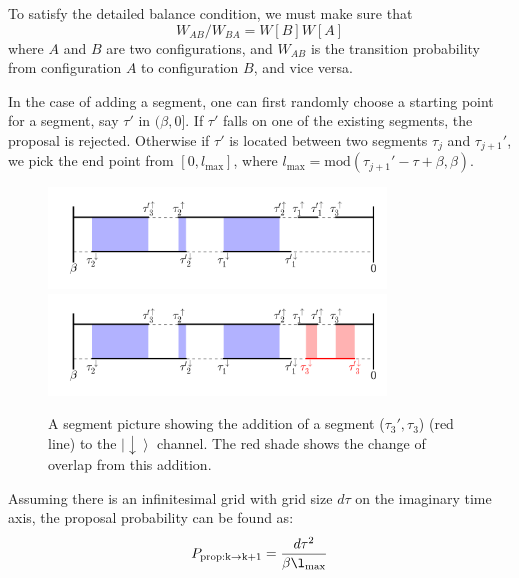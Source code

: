 To satisfy the detailed balance condition, we must make sure that 
\begin{equation}
W_{AB}/W_{BA}=W[B]W[A]
\end{equation}
where $A$ and $B$ are two configurations, and $W_{AB}$ is the transition
probability from configuration $A$ to configuration $B$, and vice versa.

In the case of adding a segment, one can first randomly choose a starting point 
for a segment, say $\tau'$ in $(\beta,0]$. If $\tau'$ falls on one of the 
existing segments, the proposal is rejected. Otherwise if $\tau'$ is located
between two segments $\tau_j$ and $\tau_{j+1}'$, we pick the end point from 
$[0,l_\textrm{max}]$, where 
$l_\textrm{max}=\mathrm{mod}(\tau_{j+1}'-\tau+\beta,\beta)$.
\begin{figure}[ht]
  \centering
  \includegraphics[width=0.8\textwidth] {img/segment.png}
  \includegraphics[width=0.8\textwidth] {img/segment_add.png}
  \caption{A segment picture showing the addition of a segment ($\tau_3',\tau_3$)
(red line) to the $\left|\downarrow\right\rangle$ channel. The red shade shows the
change of overlap from this addition.
}
\label{fig:seg_add}
\end{figure}
Assuming there is an infinitesimal grid with grid size $d\tau$ on the imaginary
time axis, the proposal probability can be found as:
\begin{equation}
P_\mathrm{prop:k\rightarrow k+1}=\frac{d\tau^2}{\beta\l_\mathrm{max}}
\end{equation}

